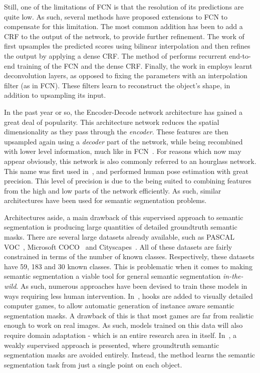 Still, one of the limitations of FCN is that the resolution of its
predictions are quite low. As such, several methods have proposed
extensions to FCN to compensate for this limitation. The most common
addition has been to add a CRF to the output of the network, to
provide further refinement. The work of \cite{chen2015semantic}
first upsamples the predicted scores using bilinear interpolation
and then refines the output by applying a dense CRF. The method of
\cite{zheng2015conditional} performs recurrent end-to-end training of
the FCN and the dense CRF. Finally, the work in \cite{noh2015learning}
employs learnt deconvolution layers, as opposed to fixing the
parameters with an interpolation filter (as in FCN). These filters
learn to reconstruct the object's shape, in addition to upsampling its
input.

In the past year or so, the Encoder-Decode network architecture has
gained a great deal of popularity. This architecture network reduces
the spatial dimensionality as they pass through the
\textit{encoder}. These features are then upsampled again using a
\textit{decoder} part of the network, while being recombined with
lower level information, much like in FCN~\cite{long2015fully}. For
reasons which now may appear obviously, this network is also commonly
referred to an hourglass network. This name was first used
in~\cite{newell2016stacked}, and performed human pose estimation with
great precision. This level of precision is due to the being suited to
combining features from the high and low parts of the network
efficiently. As such, similar architectures have been used for
semantic segmentation problems.

Architectures aside, a main drawback of this supervised approach to
semantic segmentation is producing large quantities of detailed
groundtruth semantic masks. There are several large datasets already
available, such as PASCAL VOC~\cite{everingham2010pascal}, Microsoft
COCO~\cite{lin2014microsoft} and
Cityscapes~\cite{cordts2016cityscapes}. All of these datasets are
fairly constrained in terms of the number of known
classes. Respectively, these datasets have 59, 183 and 30 known
classes. This is problematic when it comes to making semantic
segmentation a viable tool for general semantic segmentation
\textit{in-the-wild}. As such, numerous approaches have been devised
to train these models in ways requiring less human
intervention. In~\cite{richter2016playing}, hooks are added to
visually detailed computer games, to allow automatic generation of
instance aware semantic segmentation masks. A drawback of this is that
most games are far from realistic enough to work on real images. As
such, models trained on this data will also require domain adaptation
- which is an entire research area in itself. In~\cite{bearman2016s},
a weakly supervised approach is presented, where groundtruth semantic
segmentation masks are avoided entirely. Instead, the method learns
the semantic segmentation task from just a single point on each
object.

